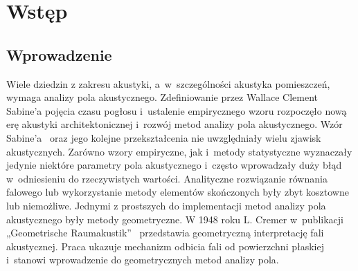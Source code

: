 \chapter{Wstęp}\label{cha:wstep}


\section{Wprowadzenie}\label{sec:wprowadzenie}

Wiele  dziedzin z zakresu akustyki, a~w~szczególności akustyka pomieszczeń, wymaga analizy pola akustycznego. Zdefiniowanie przez Wallace Clement Sabine’a pojęcia czasu pogłosu i~ustalenie empirycznego wzoru rozpoczęło nową erę akustyki architektonicznej i~rozwój metod analizy pola akustycznego. Wzór Sabine'a~\cite{b1} oraz jego kolejne przekształcenia nie uwzględniały wielu zjawisk akustycznych. Zarówno wzory empiryczne,  jak i~metody statystyczne wyznaczały jedynie niektóre parametry pola akustycznego i~często wprowadzały duży błąd w~odniesieniu do rzeczywistych wartości. Analityczne rozwiązanie równania falowego  lub wykorzystanie metody elementów skończonych były zbyt kosztowne lub niemożliwe. Jednymi z prostszych do implementacji metod analizy pola akustycznego były metody geometryczne. W 1948 roku L. Cremer w~publikacji „Geometrische Raumakustik”~\cite{b2} przedstawia geometryczną interpretację fali akustycznej. Praca ukazuje mechanizm odbicia fali od powierzchni płaskiej i~stanowi wprowadzenie do geometrycznych metod analizy pola.

